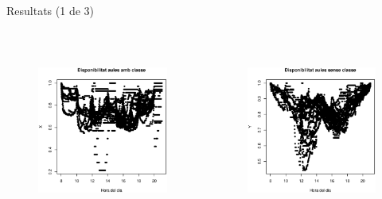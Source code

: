 \documentclass[xetex,mathserif,serif]{beamer}
\begin{document}
  \begin{frame}{Resultats (1 de 3)}
    \begin{columns}[T]
    \begin{column}{0.4\linewidth}
      \\[2cm]
      \begin{figure}
      \includegraphics[width=1\linewidth]{./images/dades_X.eps}
      \end{figure}
    \end{column}
    \begin{column}{0.4\linewidth}
      \\[2cm]
      \begin{figure}
      \includegraphics[width=1\linewidth]{./images/dades_Y.eps}

\end{figure}
\end{column}
\end{columns}
\end{frame}
\end{document}
